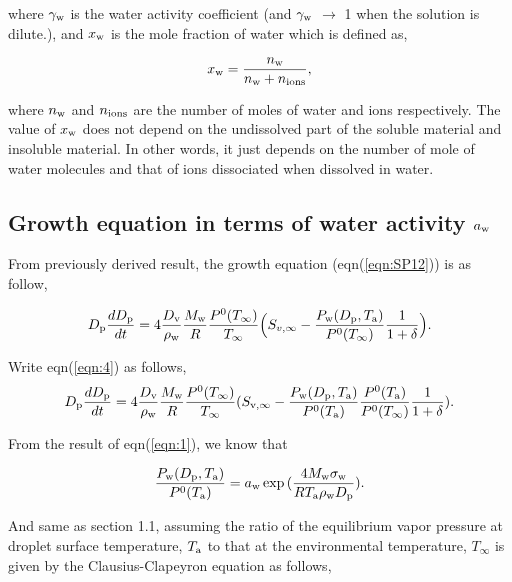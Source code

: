 \documentclass[12pt]{article}
\begin{document}
where $\gamma_{\rm w}$ is the water activity coefficient (and $\gamma_{\rm w}$ $\rightarrow$ 1 when the solution is dilute.), and $x_{\rm w}$ is the mole fraction of water which is defined as,

\begin{equation}\label{eqn:3}
x_{\rm w}=\frac{n_{\rm w}}{n_{\rm w}+n_{\rm ions}},
\end{equation}

where $n_{\rm w}$ and $n_{\rm ions}$ are the number of moles of water and ions respectively.
The value of $x_{\rm w}$ does not depend on the undissolved part of the soluble material and insoluble material. In other words, it just depends on the number of mole of water molecules and that of ions dissociated when dissolved in water.

\subsection{Growth equation in terms of water activity $a_{\rm w}$}

From previously derived result, the growth equation (eqn(\ref{eqn:SP12})) is as follow,

\begin{equation}\label{eqn:4}
D_{\rm p}\frac{dD_{\rm p}}{dt}=4 \frac{D_{\rm v}} {\rho_{\rm w}} \frac{M_{\rm w}}{R} \frac{P^{\rm 0}(T_{\infty})} {T_{\infty}} \Big(S_{v, \infty} - \frac{P_{\rm w}(D_{\rm p}, T_{\rm a})}{P^{\rm 0}(T_{\infty})} \frac{1}{1+\delta}\Big).
\end{equation}

Write eqn(\ref{eqn:4}) as follows,
\begin{equation}\label{eqn:5}
D_{\rm p}\frac{dD_{\rm p}}{dt}=4 \frac{D_{\rm v}} {\rho_{\rm w}} \frac{M_{\rm w}}{R} \frac{P^{\rm 0}(T_{\infty})} {T_{\infty}} (S_{\rm v, \infty} - \frac{P_{\rm w}(D_{\rm p}, T_{\rm a})}{P^{\rm 0}(T_{\rm a})} \frac{P^{\rm 0}(T_{\rm a})}{P^{\rm 0}(T_{\infty})}\frac{1}{1+\delta}).
\end{equation}

From the result of eqn(\ref{eqn:1}), we know that 

\begin{equation}\label{eqn:6}
\frac{P_{\rm w}(D_{\rm p}, T_{\rm a})}{P^{\rm 0}(T_{\rm a})}=a_{\rm w}\exp{(\frac{4 M_{\rm w} \sigma_{\rm w}}{R T_{\rm a} \rho_{\rm w}D_{\rm p}})}.
\end{equation}

And same as section 1.1, assuming the ratio of the equilibrium vapor pressure at droplet surface temperature, $T_{\rm a}$ to that at the environmental temperature, $T_{\infty}$ is given by the Clausius-Clapeyron equation as follows,
  
\end{document}
